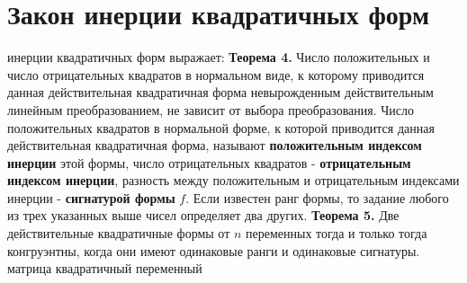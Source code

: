 \documentclass[bachelor, och, coursework, times]{SCWorks}
\newcommand\tab[1][1cm]{\hspace*{#1}}
\newcommand{\tl}{\newline\tab}
\begin{document}
\section{Закон инерции квадратичных форм}
 инерции квадратичных форм выражает:
\tl
\textbf{Теорема 4.} Число положительных и число отрицательных квадратов в нормальном виде, к которому приводится данная действительная квадратичная форма невырожденным действительным линейным преобразованием, не зависит от выбора преобразования.
\tl
Число положительных квадратов в нормальной форме, к которой приводится данная действительная квадратичная форма, называют \textbf{положительным индексом инерции} этой формы, число отрицательных квадратов - \textbf{отрицательным индексом инерции}, разность между положительным и отрицательным индексами инерции - \textbf{сигнатурой формы} $f$. Если известен ранг формы, то задание любого из трех указанных выше чисел определяет два других.
\tl
\textbf{Теорема 5.} Две действительные квадратичные формы от $n$ переменных тогда и только тогда конгруэнтны, когда они имеют одинаковые ранги и одинаковые сигнатуры.
матрица квадратичный переменный
\end{document}
